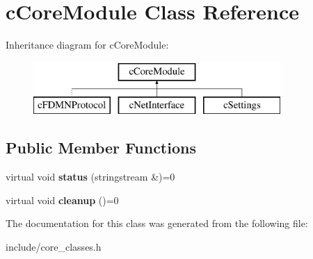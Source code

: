 \hypertarget{classcCoreModule}{\section{c\-Core\-Module \-Class \-Reference}
\label{d7/d7b/classcCoreModule}
}
\-Inheritance diagram for c\-Core\-Module\-:\begin{figure}[H]
\begin{center}
\leavevmode
\includegraphics[height=2.000000cm]{d7/d7b/classcCoreModule}
\end{center}
\end{figure}
\subsection*{\-Public \-Member \-Functions}
\begin{DoxyCompactItemize}
\item 
\hypertarget{classcCoreModule_ada5a543231ca01861d76e49d6fbd97d9}{virtual void {\bfseries status} (stringstream \&)=0}\label{d7/d7b/classcCoreModule_ada5a543231ca01861d76e49d6fbd97d9}

\item 
\hypertarget{classcCoreModule_ade87c33167c935b211aa70cd3591ad6a}{virtual void {\bfseries cleanup} ()=0}\label{d7/d7b/classcCoreModule_ade87c33167c935b211aa70cd3591ad6a}

\end{DoxyCompactItemize}


\-The documentation for this class was generated from the following file\-:\begin{DoxyCompactItemize}
\item 
include/core\-\_\-classes.\-h\end{DoxyCompactItemize}
